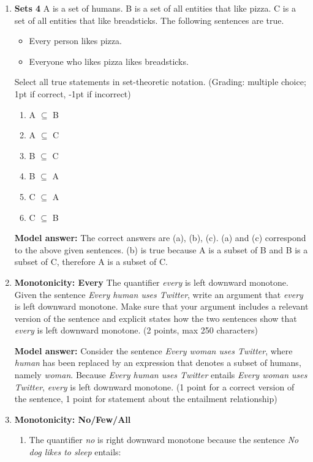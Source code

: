 \documentclass[a4,11pt]{article}
\begin{document}
\begin{enumerate}[leftmargin = 12pt]
\item {\bf Sets 4}  A is a set of humans. B is a set of all entities that like pizza. C is a set of all entities that like breadsticks.  The following sentences are true. 

\begin{itemize}[noitemsep]
\item Every person likes pizza.
\item Everyone who likes pizza likes breadsticks.
\end{itemize}

Select all true statements in set-theoretic notation. (Grading: multiple choice; 1pt if correct, -1pt if incorrect)

\begin{enumerate}
\item A $\subseteq$ B
\item A $\subseteq$ C
\item B $\subseteq$ C
\item B $\subseteq$ A
\item C $\subseteq$ A
\item C $\subseteq$ B
\end{enumerate}

{\bf Model answer:} The correct answers are (a), (b), (c). (a) and (c) correspond to the above given sentences. (b) is true because A is a subset of B and B is a subset of C, therefore A is a subset of C.

\item {\bf Monotonicity: Every} The quantifier \textit{every} is left downward monotone. Given the sentence \textit{Every human uses Twitter}, write an argument that \textit{every} is left downward monotone. Make sure that your argument includes a relevant version of the sentence and explicit states how the two sentences show that \textit{every} is left downward monotone. (2 points, max 250 characters)
	
{\bf Model answer:} Consider the sentence \textit{Every woman uses Twitter}, where \textit{human} has been replaced by an expression that denotes a subset of humans, namely \textit{woman}. Because \textit{Every human uses Twitter} entails \textit{Every woman uses Twitter}, \textit{every} is left downward monotone. (1 point for a correct version of the sentence, 1 point for statement about the entailment relationship)

\item {\bf Monotonicity: No/Few/All} 

\begin{enumerate}
\item The quantifier \textit{no} is right downward monotone because the sentence \textit{No dog likes to sleep} entails:


\end{enumerate}
\end{enumerate}
\end{document}
